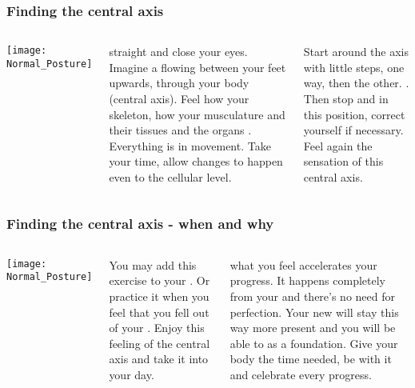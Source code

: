 \begin{frame}
\frametitle{Finding the central axis}
\hypertarget{central_axis}{}
\begin{columns}[c] %


\texttt{[image: Normal\_Posture]}

 straight and close your eyes. Imagine a  flowing between your feet upwards, through your body (central axis). Feel how your skeleton, how your musculature and their tissues and the organs . Everything is in movement. Take your time, allow changes to happen even to the cellular level.

Start  around the axis with little steps, one way, then the other. . Then stop and  in this position, correct yourself if necessary. Feel again the sensation of this central axis.
\end{columns}

\end{frame}
\begin{frame}
\frametitle{Finding the central axis - when and why}
\hypertarget{central_axis}{}
\begin{columns}[c] %


\texttt{[image: Normal\_Posture]}

You may add this exercise to your . Or practice it when you feel that you fell out of your . Enjoy this feeling of the central axis and take it into your day.

 what you feel accelerates your progress. It happens completely from your  and there's no need for perfection. Your new  will stay this way more present and you will be able to  as a foundation. Give your body the time needed, be  with it and celebrate every progress.
\end{columns}

\end{frame}
